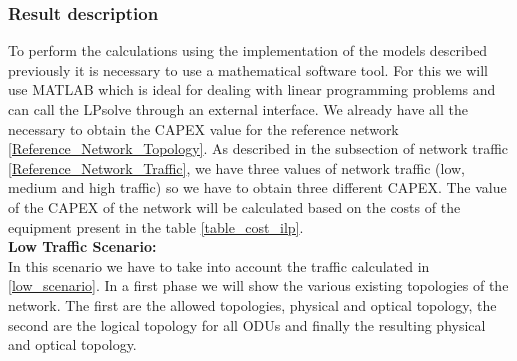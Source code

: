 \subsubsection{Result description}

To perform the calculations using the implementation of the models described previously it is necessary to use a mathematical software tool. For this we will use MATLAB which is ideal for dealing with linear programming problems and can call the LPsolve through an external interface. We already have all the necessary to obtain the CAPEX value for the reference network \ref{Reference_Network_Topology}. As described in the subsection of network traffic \ref{Reference_Network_Traffic}, we have three values of network traffic (low, medium and high traffic) so we have to obtain three different CAPEX. The value of the CAPEX of the network will be calculated based on the costs of the equipment present in the table \ref{table_cost_ilp}.\\

\vspace{17pt}
\textbf{Low Traffic Scenario:}\\

In this scenario we have to take into account the traffic calculated in \ref{low_scenario}. In a first phase we will show the various existing topologies of the network. The first are the allowed topologies, physical and optical topology, the second are the logical topology for all ODUs and finally the resulting physical and optical topology.\\

